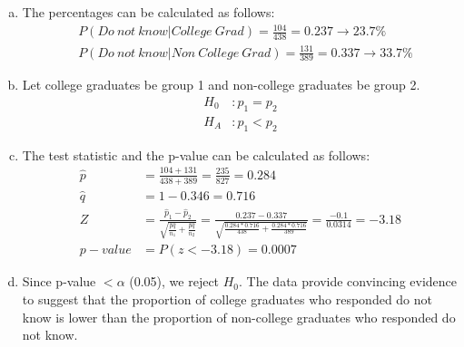 {{\begin{enumerate}[(a)]
\item The percentages can be calculated as follows:
\begin{align*}
&P(Do~not~know | College~Grad) = \frac{104}{438} = 0.237 \rightarrow 23.7\% \\
&P(Do~not~know | Non~College~Grad) = \frac{131}{389} = 0.337 \rightarrow 33.7\%
\end{align*}
\item Let college graduates be group 1 and non-college graduates be group 2.
\begin{align*}
H_0&: p_1 = p_2 \\
H_A&: p_1 < p_2
\end{align*}
\item The test statistic and the p-value can be calculated as follows:
\begin{align*}
\hat{p} &= \frac{104 + 131}{438 + 389} = \frac{235}{827} = 0.284 \\
\hat{q} &= 1 - 0.346 =  0.716 \\
Z &= \frac{\hat{p}_1 - \hat{p}_2}{\sqrt{ \frac{\hat{p}  \hat{q} }{n_1} + \frac{\hat{p} \hat{q} }{n_2} } } =  \frac{0.237 - 0.337}{\sqrt{ \frac{0.284  * 0.716 }{438} + \frac{ 0.284  * 0.716 }{389} } } = \frac{-0.1}{0.0314} = -3.18 \\
p-value &=  P(z < -3.18) = 0.0007
\end{align*}
\item Since p-value $< \alpha$ (0.05), we reject $H_0$. The data provide convincing evidence to suggest that the proportion of college graduates who responded do not know is lower than the proportion of non-college graduates who responded do not know.
\end{enumerate}
}\label{drillBabyDrill}
}

%

